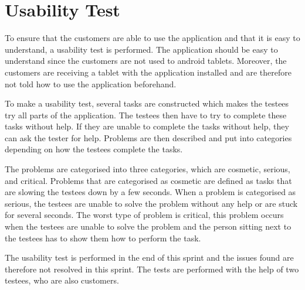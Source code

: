 \section{Usability Test}\label{sec:usability-test}
To ensure that the customers are able to use the application and that it is easy to understand, a usability test is performed.
The application should be easy to understand since the customers are not used to android tablets.
Moreover, the customers are receiving a tablet with the application installed and are therefore not told how to use the application beforehand.

To make a usability test, several tasks are constructed which makes the testees try all parts of the application. 
The testees then have to try to complete these tasks without help.
If they are unable to complete the tasks without help, they can ask the tester for help.
Problems are then described and put into categories depending on how the testees complete the tasks.

The problems are categorised into three categories, which are cosmetic, serious, and critical.
Problems that are categorised as cosmetic are defined as tasks that are slowing the testees down by a few seconds.
When a problem is categorised as serious, the testees are unable to solve the problem without any help or are stuck for several seconds.
The worst type of problem is critical, this problem occurs when the testees are unable to solve the problem and the person sitting next to the testees has to show them how to perform the task.

The usability test is performed in the end of this sprint and the issues found are therefore not resolved in this sprint.
The tests are performed with the help of two testees, who are also customers.

